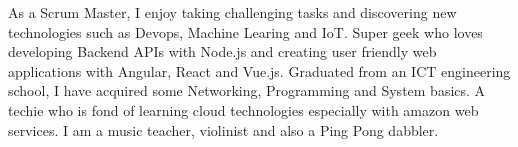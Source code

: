 

\begin{cvparagraph}\justify

As a Scrum Master, I enjoy taking challenging tasks and discovering new technologies such as Devops, Machine Learing and IoT. Super geek who loves developing Backend APIs with Node.js and creating user friendly web applications with Angular, React and Vue.js. Graduated from an ICT engineering school, I have acquired some Networking, Programming and System basics. A techie who is fond of learning cloud technologies especially with amazon web services. I am a music teacher, violinist and also a Ping Pong dabbler.
\end{cvparagraph}
